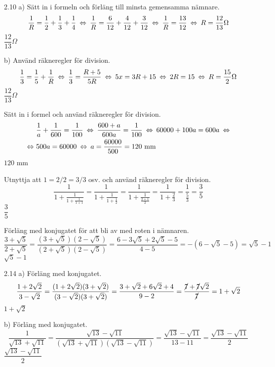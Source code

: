 \begin{task}{2.10 a)}
	Sätt in i formeln och förläng till minsta gemensamma nämnare.
	\[\frac{1}{R}=\frac{1}{2}+\frac{1}{3}+\frac{1}{4} \lra
	\frac{1}{R}=\frac{6}{12}+ \frac{4}{12}+\frac{3}{12} \lra
	\frac{1}{R}=\frac{13}{12} \lra
	R=\frac{12}{13}\Omega\]
	\ans $\dfrac{12}{13}\Omega$
\end{task}

\begin{task}{b)}
	Använd räkneregler för division.
	\[\frac{1}{3}=\frac{1}{5}+\frac{1}{R} \lra
	\frac{1}{3}=\frac{R+5}{5R} \lra
	5x=3R+15 \lra
	2R=15 \lra
	R=\frac{15}{2} \Omega\]
	\ans $\dfrac{12}{13}\Omega$
\end{task}

\begin{task}{2.11}
	Sätt in i formel och använd räkneregler för division.
	\begin{align*}
	& \frac{1}{a}+\frac{1}{600}=\frac{1}{100} \lra
	\frac{600+a}{600a}=\frac{1}{100} \lra
	60000+100a=600a \lra \\ \lra
	& 500a=60000 \lra
	a=\frac{60000}{500}=120\text{ mm}
	\end{align*}
	\ans $120$ mm
\end{task}

\begin{task}{2.12}
	Utnyttja att $1=2/2=3/3$ osv. och använd räkneregler för division.
	\[\dfrac{1}{1+\frac{1}{1+\frac{1}{1+1}}}=
	\dfrac{1}{1+\frac{1}{1+\frac{1}{2}}}=
	\dfrac{1}{1+\frac{1}{\frac{2+1}{2}}}=
	\dfrac{1}{1+\frac{2}{3}}=
	\dfrac{1}{\frac{5}{3}}=
	\dfrac{3}{5}\]
	\ans $\dfrac{3}{5}$
\end{task}

\begin{task}{2.13}
	Förläng med konjugatet för att bli av med roten i nämnaren.
	\[\dfrac{3+\sqrt{5}}{2+\sqrt{5}}=
	\dfrac{(3+\sqrt{5})(2-\sqrt{5})}{(2+\sqrt{5})(2-\sqrt{5})}=
	\dfrac{6-3\sqrt{5}+2\sqrt{5}-5}{4-5}=
	-(6-\sqrt{5}-5)=
	\sqrt{5}-1\]
	\ans $\sqrt{5}-1$
\end{task}

\begin{task}{2.14 a)}
	Förläng med konjugatet.
	\[\dfrac{1+2\sqrt{2}}{3-\sqrt{2}}=
	\dfrac{(1+2\sqrt{2})(3+\sqrt{2})}{(3-\sqrt{2})(3+\sqrt{2})}=
	\dfrac{3+\sqrt{2}+6\sqrt{2}+4}{9-2}=
	\dfrac{\cancel{7}+\cancel{7}\sqrt{2}}{\cancel{7}}=
	1+\sqrt{2}\]
	\ans $1+\sqrt{2}$
\end{task}

\begin{task}{b)}
	Förläng med konjugatet.
	\[\dfrac{1}{\sqrt{13}+\sqrt{11}}=
	\dfrac{\sqrt{13}-\sqrt{11}}{(\sqrt{13}+\sqrt{11})(\sqrt{13}-\sqrt{11})}=
	\dfrac{\sqrt{13}-\sqrt{11}}{13-11}=
	\dfrac{\sqrt{13}-\sqrt{11}}{2}\]
	\ans $\dfrac{\sqrt{13}-\sqrt{11}}{2}$
\end{task}

